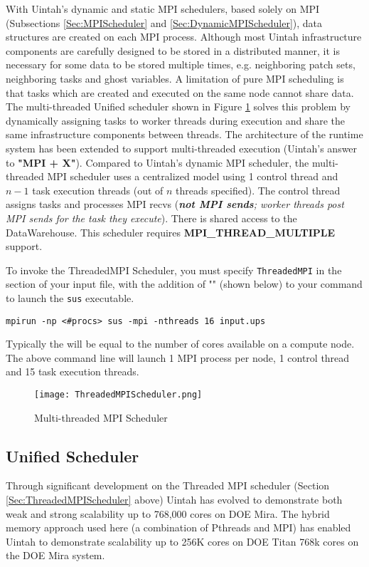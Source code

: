 With Uintah's dynamic and static MPI schedulers, based solely on MPI
(Subsections \ref{Sec:MPIScheduler} and \ref{Sec:DynamicMPIScheduler}), data
structures are created on each MPI process. Although most Uintah
infrastructure components are carefully designed to be stored in a distributed
manner, it is necessary for some data to be stored multiple times, e.g.
neighboring patch sets, neighboring tasks and ghost variables. A limitation of
pure MPI scheduling is that tasks which are created and executed on the same
node cannot share data. The multi-threaded Unified scheduler shown in Figure
\ref{fig:UnifiedScheduler} solves this problem by dynamically assigning tasks
to worker threads during execution and share the same infrastructure components
between threads. The architecture of the runtime system has been extended to
support multi-threaded execution (Uintah's answer to \textbf{"MPI + X"}).
Compared to Uintah’s dynamic MPI scheduler, the multi-threaded MPI scheduler
uses a centralized model using 1 control thread and $n-1$ task execution
threads (out of $n$ threads specified). The control thread assigns tasks and
processes MPI recvs (\emph{\textbf{not MPI sends}; worker threads post MPI sends for the task they execute}). There is shared access to the DataWarehouse. This scheduler requires \textbf{MPI\_THREAD\_MULTIPLE} support.

To invoke the ThreadedMPI Scheduler, you must specify \texttt{ThreadedMPI} in
the  section of your input file, with the addition of
"" (shown below) to your command to launch the \texttt{sus}
executable.

\begin{Verbatim}[fontsize=\footnotesize]
mpirun -np <#procs> sus -mpi -nthreads 16 input.ups
\end{Verbatim}

Typically the  will be equal to the number of cores available on a
compute node. The above command line will launch 1 MPI process per node, 1
control thread and 15  task execution threads.

\begin{figure}[H]
  \centering
  \texttt{[image: ThreadedMPIScheduler.png]}
  \caption{Multi-threaded MPI Scheduler}
  \label{fig:UnifiedScheduler}
\end{figure}


\subsection{Unified Scheduler} \label{Sec:UnifiedScheduler}
Through significant development on the Threaded MPI scheduler (Section
\ref{Sec:ThreadedMPIScheduler} above) Uintah has evolved to demonstrate both
weak and strong scalability up to 768,000 cores on DOE Mira. The hybrid memory
approach used here (a combination of Pthreads and MPI) has enabled Uintah to
demonstrate scalability up to 256K cores on DOE Titan 768k cores on the DOE
Mira system.

